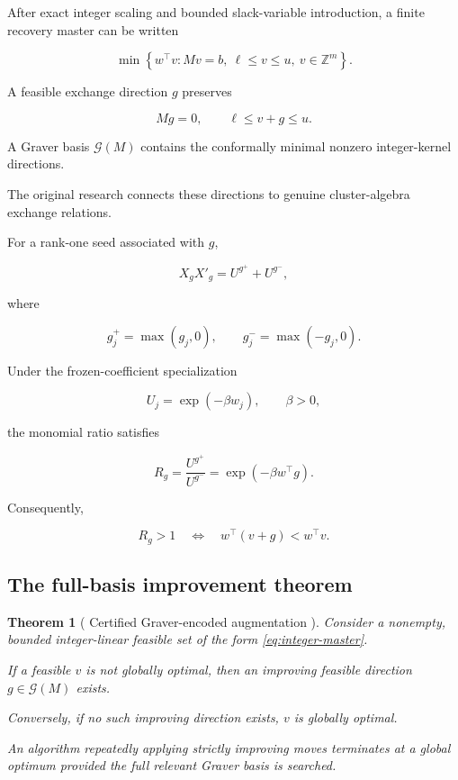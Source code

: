 \documentclass[10pt,a4paper]{article}
\newcommand{\ZZ}{\mathbb{Z}}
\theoremstyle{plain}
\newtheorem{theorem}{Theorem}[section]
\theoremstyle{definition}
\theoremstyle{remark}
\begin{document}
After exact integer scaling and
bounded slack-variable introduction,
a finite recovery master can be written

\begin{equation}
\min
\left\{
w^\top v:
Mv=b,\ 
\ell\leq v\leq u,\ 
v\in\ZZ^m
\right\}.
\label{eq:integer-master}
\end{equation}

A feasible exchange direction \(g\)
preserves

\begin{equation}
Mg=0,
\qquad
\ell\leq v+g\leq u.
\label{eq:kernel}
\end{equation}

A Graver basis
\(\mathcal G(M)\)
contains the conformally minimal
nonzero integer-kernel directions.

The original research connects
these directions to genuine
cluster-algebra exchange relations.

For a rank-one seed associated with \(g\),

\begin{equation}
X_gX'_g
=
U^{g^+}+U^{g^-},
\label{eq:cluster}
\end{equation}

where

\[
g_j^+=\max(g_j,0),
\qquad
g_j^-=\max(-g_j,0).
\]

Under the frozen-coefficient specialization

\[
U_j=\exp(-\beta w_j),
\qquad
\beta>0,
\]

the monomial ratio satisfies

\begin{equation}
R_g
=
\frac{U^{g^+}}{U^{g^-}}
=
\exp(-\beta w^\top g).
\label{eq:mutation-gain}
\end{equation}

Consequently,

\[
R_g>1
\quad\Longleftrightarrow\quad
w^\top(v+g)<w^\top v.
\]

\subsection{The full-basis improvement theorem}

\begin{theorem}[
Certified Graver-encoded augmentation
\cite{relaymodel3}
]
Consider a nonempty, bounded integer-linear
feasible set of the form
\eqref{eq:integer-master}.

If a feasible \(v\) is not globally optimal,
then an improving feasible direction
\(g\in\mathcal G(M)\) exists.

Conversely, if no such improving direction exists,
\(v\) is globally optimal.

An algorithm repeatedly applying
strictly improving moves terminates
at a global optimum provided
the full relevant Graver basis is searched.
\end{theorem}
\end{document}

